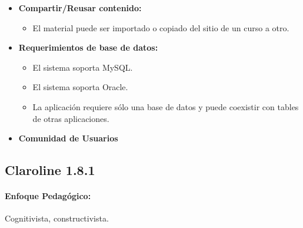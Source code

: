 	\begin{itemize}
	\item \textbf{Compartir/Reusar contenido:}
		\begin{itemize}
			\item El material puede ser importado o copiado del sitio de un curso a otro.
		\end{itemize}
	\end{itemize}
	\begin{itemize}
		\item \textbf{Requerimientos de base de datos:}
			\begin{itemize}	
				\item El sistema soporta MySQL.
				\item El sistema soporta Oracle.
				\item La aplicación requiere sólo una base de datos y puede coexistir con tables de otras aplicaciones.
			\end{itemize}
	\end{itemize}
	\begin{itemize}
		\item \textbf{Comunidad de Usuarios}
	\end{itemize}

\subsection{Claroline 1.8.1}
	\paragraph{Enfoque Pedagógico:} Cognitivista, constructivista.
